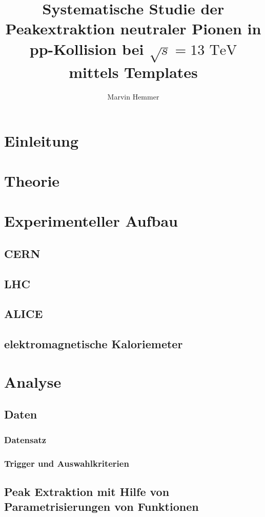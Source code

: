 \documentclass[]{article}
\title{Systematische Studie der Peakextraktion neutraler Pionen in pp-Kollision bei $\sqrt{s}=13\text{ TeV}$ mittels Templates}
\author{Marvin Hemmer}
\begin{document}
\maketitle
\newpage
\tableofcontents
\newpage

	\section{Einleitung}
	\section{Theorie}

	\section{Experimenteller Aufbau}
	\subsection{CERN}
	\subsection{LHC}
	\subsection{ALICE}
	\subsection{elektromagnetische Kaloriemeter}

	\section{Analyse}
	\subsection{Daten}
	\subsubsection{Datensatz}
	\subsubsection{Trigger und Auswahlkriterien}
	\subsection{Peak Extraktion mit Hilfe von Parametrisierungen von Funktionen}	
\end{document}
